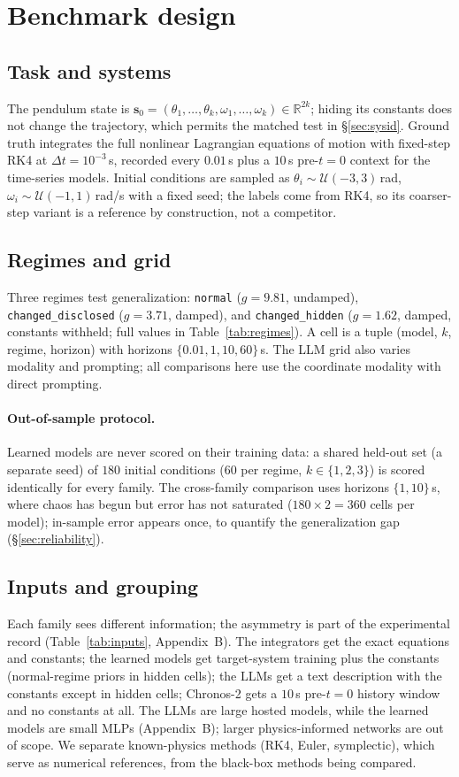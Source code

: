 \documentclass{article}
\begin{document}
\section{Benchmark design}
\subsection{Task and systems}
The pendulum state is $\mathbf{s}_0=(\theta_1,\dots,\theta_k,\omega_1,\dots,\omega_k)\in
\mathbb{R}^{2k}$; hiding its constants does not change the trajectory, which permits the
matched test in \S\ref{sec:sysid}. Ground truth integrates the full nonlinear
Lagrangian equations of motion with fixed-step RK4 at $\Delta t{=}10^{-3}$\,s, recorded every $0.01$\,s plus a
$10$\,s pre-$t{=}0$ context for the time-series models. Initial
conditions are sampled as $\theta_i\sim\mathcal{U}(-3,3)$\,rad,
$\omega_i\sim\mathcal{U}(-1,1)$\,rad/s with a fixed seed; the labels come from RK4, so its
coarser-step variant is a reference by construction, not a competitor.

\subsection{Regimes and grid}
Three regimes test generalization: \texttt{normal} ($g{=}9.81$, undamped),
\texttt{changed\_disclosed} ($g{=}3.71$, damped), and \texttt{changed\_hidden} ($g{=}1.62$,
damped, constants withheld; full values in Table~\ref{tab:regimes}). A cell is a
tuple (model, $k$, regime, horizon) with horizons
$\{0.01,1,10,60\}$\,s. The LLM grid also varies modality and prompting; all comparisons here
use the coordinate modality with direct prompting.

\paragraph{Out-of-sample protocol.} Learned models are never scored on their training data: a
shared held-out set (a separate seed) of $180$ initial conditions ($60$ per regime,
$k\in\{1,2,3\}$) is scored identically for every family. The cross-family comparison uses
horizons $\{1,10\}$\,s, where chaos has begun but error has not saturated
($180\times2=360$ cells per model); in-sample error appears once, to quantify the
generalization gap (\S\ref{sec:reliability}).

\subsection{Inputs and grouping}
\label{sec:inputs}
Each family sees different information; the asymmetry is part of the experimental record
(Table~\ref{tab:inputs}, Appendix~B). The integrators get the exact equations and constants;
the learned models get target-system training plus the constants (normal-regime priors in
hidden cells); the LLMs get a text description with the constants except in hidden cells;
Chronos-2 gets a $10$\,s pre-$t{=}0$ history window and no constants at all. The LLMs are large
hosted models, while the learned models are small MLPs (Appendix~B); larger
physics-informed networks are out of scope. We separate known-physics methods (RK4, Euler,
symplectic), which serve as numerical references, from the black-box methods being compared.
\end{document}
